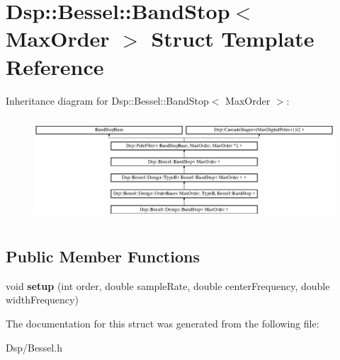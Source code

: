 \hypertarget{structDsp_1_1Bessel_1_1BandStop}{\section{Dsp\-:\-:Bessel\-:\-:Band\-Stop$<$ Max\-Order $>$ Struct Template Reference}
\label{structDsp_1_1Bessel_1_1BandStop}
}
Inheritance diagram for Dsp\-:\-:Bessel\-:\-:Band\-Stop$<$ Max\-Order $>$\-:\begin{figure}[H]
\begin{center}
\leavevmode
\includegraphics[height=3.916084cm]{structDsp_1_1Bessel_1_1BandStop}
\end{center}
\end{figure}
\subsection*{Public Member Functions}
\begin{DoxyCompactItemize}
\item 
\hypertarget{structDsp_1_1Bessel_1_1BandStop_a42aa86efd7ea5b2dae50ac4d75603b1e}{void {\bfseries setup} (int order, double sample\-Rate, double center\-Frequency, double width\-Frequency)}\label{structDsp_1_1Bessel_1_1BandStop_a42aa86efd7ea5b2dae50ac4d75603b1e}

\end{DoxyCompactItemize}


The documentation for this struct was generated from the following file\-:\begin{DoxyCompactItemize}
\item 
Dsp/Bessel.\-h\end{DoxyCompactItemize}

